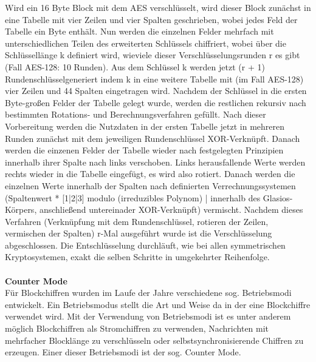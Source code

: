 \documentclass[12pt,a4paper,bibliography=totocnumbered,listof=totocnumbered]{scrartcl}
\begin{document}
Wird ein 16 Byte Block mit dem AES verschlüsselt, wird dieser Block zunächst in eine Tabelle mit vier Zeilen und vier Spalten geschrieben, wobei jedes Feld der Tabelle ein Byte enthält. Nun werden die einzelnen Felder mehrfach mit unterschiedlichen Teilen des erweiterten Schlüssels chiffriert, wobei über die Schlüssellänge k definiert wird, wieviele dieser Verschlüsselungsrunden r es gibt (Fall AES-128: 10 Runden). Aus dem Schlüssel k werden jetzt (r + 1) Rundenschlüsselgeneriert indem k in eine weitere Tabelle mit (im Fall AES-128) vier Zeilen und 44 Spalten eingetragen wird. Nachdem der Schlüssel in die ersten Byte-großen Felder der Tabelle gelegt wurde, werden die restlichen rekursiv nach bestimmten Rotations- und Berechnungsverfahren gefüllt. Nach dieser Vorbereitung werden die Nutzdaten in der ersten Tabelle jetzt in mehreren Runden zunächst mit dem jeweiligen Rundenschlüssel XOR-Verknüpft. Danach werden die einzenen Felder der Tabelle wieder nach festgelegten Prinzipien innerhalb ihrer Spalte nach links verschoben. Links herausfallende Werte werden rechts wieder in die Tabelle eingefügt, es wird also rotiert. Danach werden die einzelnen Werte innerhalb der Spalten nach definierten Verrechnungssystemen (Spaltenwert * [1|2|3] modulo (irreduzibles Polynom) | innerhalb des Glasios-Körpers, anschließend untereinader XOR-Verknüpft) vermischt. Nachdem dieses Verfahren (Verknüpfung mit dem Rundenschlüssel, rotieren der Zeilen, vermischen der Spalten) r-Mal ausgeführt wurde ist die Verschlüsselung abgeschlossen. Die Entschlüsselung durchläuft, wie bei allen symmetrischen Kryptosystemen, exakt die selben Schritte in umgekehrter Reihenfolge. \cite{4}\cite{5}\\
\\\textbf{Counter Mode}\\
Für Blockchiffren wurden im Laufe der Jahre verschiedene sog. Betriebsmodi entwickelt. Ein Betriebsmodus stellt die Art und Weise da in der eine Blockchiffre verwendet wird. Mit der Verwendung von Betriebsmodi ist es unter anderem möglich Blockchiffren   als   Stromchiffren   zu   verwenden,   Nachrichten   mit   mehrfacher   Blocklänge   zu   verschlüsseln   oder selbstsynchronisierende Chiffren zu erzeugen. Einer dieser Betriebsmodi ist der sog. Counter Mode.
\end{document}
